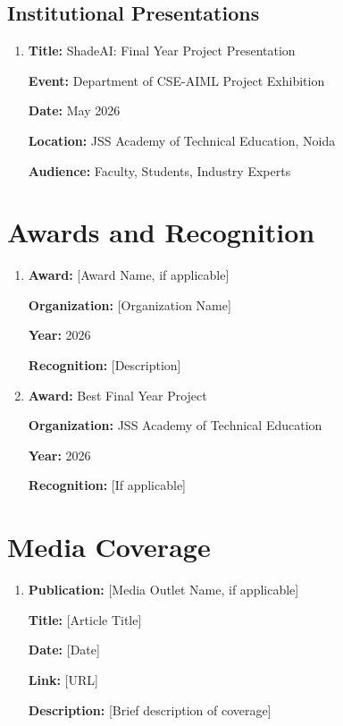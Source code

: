 \subsection{Institutional Presentations}

\begin{enumerate}
    \item \textbf{Title:} ShadeAI: Final Year Project Presentation
    
    \textbf{Event:} Department of CSE-AIML Project Exhibition
    
    \textbf{Date:} May 2026
    
    \textbf{Location:} JSS Academy of Technical Education, Noida
    
    \textbf{Audience:} Faculty, Students, Industry Experts
\end{enumerate}

\section{Awards and Recognition}

\begin{enumerate}
    \item \textbf{Award:} [Award Name, if applicable]
    
    \textbf{Organization:} [Organization Name]
    
    \textbf{Year:} 2026
    
    \textbf{Recognition:} [Description]
    
    \vspace{0.5cm}
    
    \item \textbf{Award:} Best Final Year Project
    
    \textbf{Organization:} JSS Academy of Technical Education
    
    \textbf{Year:} 2026
    
    \textbf{Recognition:} [If applicable]
\end{enumerate}

\section{Media Coverage}

\begin{enumerate}
    \item \textbf{Publication:} [Media Outlet Name, if applicable]
    
    \textbf{Title:} [Article Title]
    
    \textbf{Date:} [Date]
    
    \textbf{Link:} [URL]
    
    \textbf{Description:} [Brief description of coverage]
\end{enumerate}

